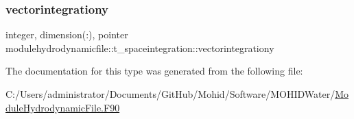 \subsubsection{\texorpdfstring{vectorintegrationy}{vectorintegrationy}}
{\footnotesize\ttfamily integer, dimension(\+:), pointer modulehydrodynamicfile\+::t\+\_\+spaceintegration\+::vectorintegrationy\hspace{0.3cm}{\ttfamily [private]}}



The documentation for this type was generated from the following file\+:\begin{DoxyCompactItemize}
\item 
C\+:/\+Users/administrator/\+Documents/\+Git\+Hub/\+Mohid/\+Software/\+M\+O\+H\+I\+D\+Water/\mbox{\hyperlink{_module_hydrodynamic_file_8_f90}{Module\+Hydrodynamic\+File.\+F90}}\end{DoxyCompactItemize}
